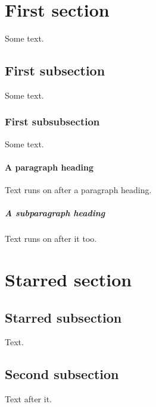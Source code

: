 \documentclass{article}
\begin{document}
\section{First section}
Some text.
\subsection{First subsection}
Some text.
\subsubsection{First subsubsection}
Some text.
\paragraph{A paragraph heading} Text runs on after a paragraph heading.
\subparagraph{A subparagraph heading} Text runs on after it too.
\section*{Starred section}
\subsection*{Starred subsection}
Text.
\subsection{Second subsection}
Text after it.
\end{document}
